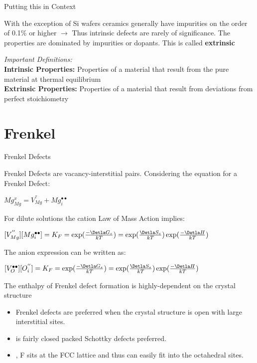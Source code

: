 \documentclass{libs/XJTLU_format}
\begin{document}
\begin{frame}{Putting this in Context}

With the exception of Si wafers ceramics generally have impurities on the order of 0.1\% or higher \pause $\rightarrow$ Thus intrinsic defects are rarely of significance. The properties are dominated by impurities or dopants. This is called \textbf{extrinsic}\\[0.3cm] \pause

\emph{Important Definitions:}\\[6 pt]
\textbf{Intrinsic Properties:} Properties of a material that result from the pure material at thermal equilibrium\\\pause
\textbf{Extrinsic Properties:} Properties of a material that result from deviations from perfect stoichiometry 
    
\end{frame}
\section{Frenkel}
\begin{frame}{Frenkel Defects}

Frenkel Defects are vacancy-interstitial pairs. Considering  the equation for a Frenkel Defect:\\[0.1cm] \pause

\centering
$Mg_{Mg}^x=V_{Mg}^{''} + Mg_{i}^{\bullet \bullet}$\\[0.1cm] \pause

\justifying
For dilute solutions the cation Law of Mass Action implies:

\centering
$[V_{Mg}^{''}][Mg_{i}^{\bullet \bullet}] = K_F = \exp(\frac{-\Detla G_s}{kT}) = \exp(\frac{\Detla S_s}{kT})\exp(\frac{-\Detla H}{kT})$ \\[6 pt] \pause

\justifying
The anion expression can be written as: 

\centering
$[V_{O}^{\bullet \bullet}][O_{i}^{''}] = K_F = \exp(\frac{-\Detla G_s}{kT}) = \exp(\frac{\Detla S_s}{kT})\exp(\frac{-\Detla H}{kT})$ \\[6 pt] \pause

\justifying
The enthalpy of Frenkel defect formation is highly-dependent on the crystal structure
\begin{itemize}
    \item Frenkel defects are preferred when the crystal structure is open with large interstitial sites. \pause
    \item {} is fairly closed packed Schottky defects preferred.
    \item {}, F sits at the FCC lattice and thus can easily fit into the octahedral sites. 
\end{itemize}
\end{frame}
\end{document}
